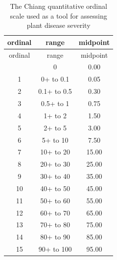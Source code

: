 \documentclass[
  letterpaper,
]{book}
\begin{document}
\hypertarget{tbl-chiang}{}
\begin{longtable}[]{@{}ccc@{}}
\caption{\label{tbl-chiang}The Chiang quantitative ordinal scale used as
a tool for assessing plant disease severity}\tabularnewline
\toprule\noalign{}
ordinal & range & midpoint \\
\midrule\noalign{}
\endfirsthead
\toprule\noalign{}
ordinal & range & midpoint \\
\midrule\noalign{}
\endhead
\bottomrule\noalign{}
\endlastfoot
0 & 0 & 0.00 \\
1 & 0+ to 0.1 & 0.05 \\
2 & 0.1+ to 0.5 & 0.30 \\
3 & 0.5+ to 1 & 0.75 \\
4 & 1+ to 2 & 1.50 \\
5 & 2+ to 5 & 3.00 \\
6 & 5+ to 10 & 7.50 \\
7 & 10+ to 20 & 15.00 \\
8 & 20+ to 30 & 25.00 \\
9 & 30+ to 40 & 35.00 \\
10 & 40+ to 50 & 45.00 \\
11 & 50+ to 60 & 55.00 \\
12 & 60+ to 70 & 65.00 \\
13 & 70+ to 80 & 75.00 \\
14 & 80+ to 90 & 85.00 \\
15 & 90+ to 100 & 95.00 \\
\end{longtable}
\end{document}
